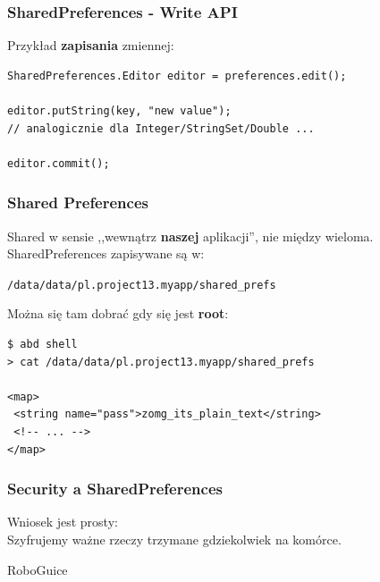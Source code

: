 \begin{frame}[fragile]\frametitle{SharedPreferences - Write API}
 Przykład \textbf{zapisania} zmiennej:
\begin{lstlisting}
SharedPreferences.Editor editor = preferences.edit();

editor.putString(key, "new value");
// analogicznie dla Integer/StringSet/Double ...

editor.commit();
\end{lstlisting}
\end{frame}


\begin{frame}[fragile]\frametitle{Shared Preferences}
 Shared w sensie ,,wewnątrz \textbf{naszej} aplikacji'', nie między wieloma.\\
 SharedPreferences zapisywane są w: \\
 \begin{center}
  \texttt{/data/data/pl.project13.myapp/shared\_prefs} 
 \end{center}

\pause

Można się tam dobrać gdy się jest \textbf{root}:
\begin{verbatim}
$ abd shell
> cat /data/data/pl.project13.myapp/shared_prefs

<map>
 <string name="pass">zomg_its_plain_text</string>
 <!-- ... -->
</map>
\end{verbatim}
\end{frame}


\begin{frame}\frametitle{Security a SharedPreferences}
\begin{center}
 Wniosek jest prosty:\\ 
 Szyfrujemy ważne rzeczy trzymane gdziekolwiek na komórce.
\end{center}
\end{frame}

\begin{frame}
 \begin{center}
  \Huge{RoboGuice}
 \end{center}

\end{frame}



